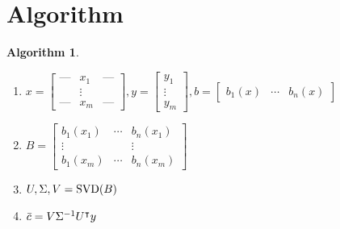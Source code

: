 \documentclass{article}%
\newtheorem{algorithm}[theorem]{Algorithm}
\begin{document}
\section{Algorithm}

\begin{algorithm}
\ 

\begin{enumerate}
\item $x = \begin{bmatrix}
    \textbf{---} & x_1 & \textbf{---}\\
     & \vdots & \\
     \textbf{---} & x_m & \textbf{---}
\end{bmatrix}, y=\begin{bmatrix}
    y_1 \\ \vdots \\ y_m
\end{bmatrix}, b = \begin{bmatrix}
    b_1(x) & \cdots & b_n(x)
\end{bmatrix}$
\item $B=
\begin{bmatrix}
b_1\left(  x_{1}\right)   & \cdots & b_n\left(  x_1\right)  \\
\vdots &  & \vdots\\
b_1\left(  x_m\right)   & \cdots & b_n\left(  x_m\right)
\end{bmatrix}$

\item $U, \Sigma, V = \textnormal{SVD} (B)$

\item $\Bar{c} = V \Sigma^{-1} U^\intercal y$
\end{enumerate}
\end{algorithm}
\end{document}
